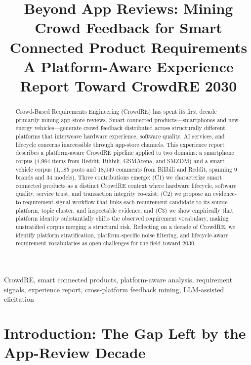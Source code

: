 \documentclass[conference]{IEEEtran}
\begin{document}
\title{Beyond App Reviews: Mining Crowd Feedback for Smart Connected Product Requirements\\
{\large A Platform-Aware Experience Report Toward CrowdRE 2030}}

\author{
}

\maketitle

\begin{abstract}
Crowd-Based Requirements Engineering (CrowdRE) has spent its first decade primarily mining app store reviews. Smart connected products---smartphones and new-energy vehicles---generate crowd feedback distributed across structurally different platforms that interweave hardware experience, software quality, AI services, and lifecycle concerns inaccessible through app-store channels. This experience report describes a platform-aware CrowdRE pipeline applied to two domains: a smartphone corpus (4,984 items from Reddit, Bilibili, GSMArena, and SMZDM) and a smart vehicle corpus (1,185 posts and 18,049 comments from Bilibili and Reddit, spanning 9 brands and 34 models). Three contributions emerge: (C1) we characterize smart connected products as a distinct CrowdRE context where hardware lifecycle, software quality, service trust, and transaction integrity co-exist; (C2) we propose an evidence-to-requirement-signal workflow that links each requirement candidate to its source platform, topic cluster, and inspectable evidence; and (C3) we show empirically that platform identity substantially shifts the observed requirement vocabulary, making unstratified corpus merging a structural risk. Reflecting on a decade of CrowdRE, we identify platform stratification, platform-specific noise filtering, and lifecycle-aware requirement vocabularies as open challenges for the field toward 2030.
\end{abstract}

\begin{IEEEkeywords}
CrowdRE, smart connected products, platform-aware analysis, requirement signals, experience report, cross-platform feedback mining, LLM-assisted elicitation
\end{IEEEkeywords}

\section{Introduction: The Gap Left by the App-Review Decade}
\end{document}
